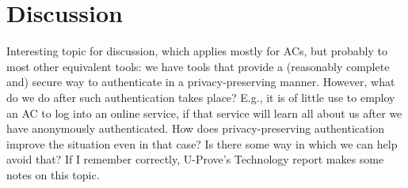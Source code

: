 \section{Discussion}
\label{sec:discussion}


Interesting topic for discussion, which applies mostly for ACs, but probably
to most other equivalent tools: we have tools that provide a (reasonably
complete and) secure way to authenticate in a privacy-preserving manner.
However, what do we do after such authentication takes place? E.g., it is of
little use to employ an AC to log into an online service, if that service
will learn all about us after we have anonymously authenticated. How does
privacy-preserving authentication improve the situation even in that case?
Is there some way in which we can help avoid that? If I remember correctly,
U-Prove's Technology report makes some notes on this topic.


